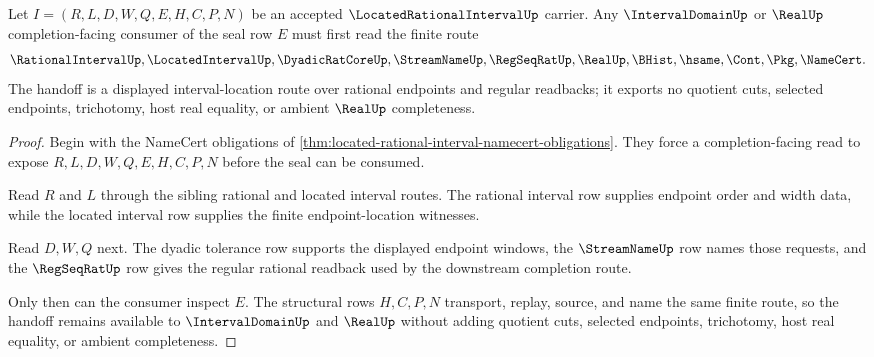 \begin{theorem}
\label{thm:located-rational-interval-real-seal-handoff}
Let $I=(R,L,D,W,Q,E,H,C,P,N)$ be an accepted $\LocatedRationalIntervalUp$ carrier. Any $\IntervalDomainUp$ or $\RealUp$ completion-facing consumer of the seal row $E$ must first read the finite route
$$
\RationalIntervalUp,\LocatedIntervalUp,\DyadicRatCoreUp,\StreamNameUp,\RegSeqRatUp,\RealUp,\BHist,\hsame,\Cont,\Pkg,\NameCert.
$$
The handoff is a displayed interval-location route over rational endpoints and regular readbacks; it exports no quotient cuts, selected endpoints, trichotomy, host real equality, or ambient $\RealUp$ completeness.
\end{theorem}
\begin{proof}
Begin with the NameCert obligations of \autoref{thm:located-rational-interval-namecert-obligations}. They force a completion-facing read to expose $R,L,D,W,Q,E,H,C,P,N$ before the seal can be consumed.

Read $R$ and $L$ through the sibling rational and located interval routes. The rational interval row supplies endpoint order and width data, while the located interval row supplies the finite endpoint-location witnesses.

Read $D,W,Q$ next. The dyadic tolerance row supports the displayed endpoint windows, the $\StreamNameUp$ row names those requests, and the $\RegSeqRatUp$ row gives the regular rational readback used by the downstream completion route.

Only then can the consumer inspect $E$. The structural rows $H,C,P,N$ transport, replay, source, and name the same finite route, so the handoff remains available to $\IntervalDomainUp$ and $\RealUp$ without adding quotient cuts, selected endpoints, trichotomy, host real equality, or ambient completeness.
\end{proof}


\begin{closurestatus}{\LocatedRationalIntervalUp}
  \theoryclosure{\seedClosure}
  \formalstatus{\unformalizedV}
\end{closurestatus}
